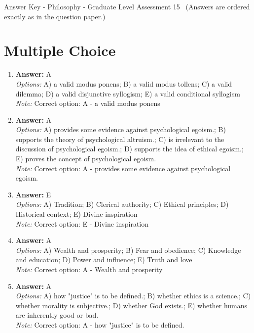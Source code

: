 \documentclass[12pt]{article}
\begin{document}
\begin{center}
Answer Key - Philosophy - Graduate Level Assessment 15 \
\small (Answers are ordered exactly as in the question paper.)
\end{center}

\section*{Multiple Choice}
\begin{enumerate}[label=\arabic*.]
\item \textbf{Answer:} A
\\ \textit{Options:} A) a valid modus ponens; B) a valid modus tollens; C) a valid dilemma; D) a valid disjunctive syllogism; E) a valid conditional syllogism
\\ \textit{Note:} Correct option: A - a valid modus ponens
\item \textbf{Answer:} A
\\ \textit{Options:} A) provides some evidence against psychological egoism.; B) supports the theory of psychological altruism.; C) is irrelevant to the discussion of psychological egoism.; D) supports the idea of ethical egoism.; E) proves the concept of psychological egoism.
\\ \textit{Note:} Correct option: A - provides some evidence against psychological egoism.
\item \textbf{Answer:} E
\\ \textit{Options:} A) Tradition; B) Clerical authority; C) Ethical principles; D) Historical context; E) Divine inspiration
\\ \textit{Note:} Correct option: E - Divine inspiration
\item \textbf{Answer:} A
\\ \textit{Options:} A) Wealth and prosperity; B) Fear and obedience; C) Knowledge and education; D) Power and influence; E) Truth and love
\\ \textit{Note:} Correct option: A - Wealth and prosperity
\item \textbf{Answer:} A
\\ \textit{Options:} A) how "justice" is to be defined.; B) whether ethics is a science.; C) whether morality is subjective.; D) whether God exists.; E) whether humans are inherently good or bad.
\\ \textit{Note:} Correct option: A - how "justice" is to be defined.
\end{enumerate}
\end{document}
